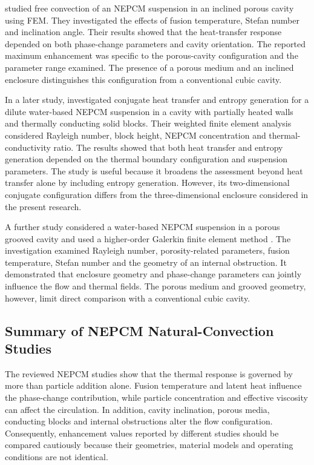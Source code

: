 \citet{ghalambaz2020} studied free convection of an NEPCM suspension in an inclined porous cavity using FEM. They investigated the effects of fusion temperature, Stefan number and inclination angle. Their results showed that the heat-transfer response depended on both phase-change parameters and cavity orientation. The reported maximum enhancement was specific to the porous-cavity configuration and the parameter range examined. The presence of a porous medium and an inclined enclosure distinguishes this configuration from a conventional cubic cavity.

In a later study, \citet{ghalambaz2023} investigated conjugate heat transfer and entropy generation for a dilute water-based NEPCM suspension in a cavity with partially heated walls and thermally conducting solid blocks. Their weighted finite element analysis considered Rayleigh number, block height, NEPCM concentration and thermal-conductivity ratio. The results showed that both heat transfer and entropy generation depended on the thermal boundary configuration and suspension parameters. The study is useful because it broadens the assessment beyond heat transfer alone by including entropy generation. However, its two-dimensional conjugate configuration differs from the three-dimensional enclosure considered in the present research.

A further study considered a water-based NEPCM suspension in a porous grooved cavity and used a higher-order Galerkin finite element method \citep{hussain2022}. The investigation examined Rayleigh number, porosity-related parameters, fusion temperature, Stefan number and the geometry of an internal obstruction. It demonstrated that enclosure geometry and phase-change parameters can jointly influence the flow and thermal fields. The porous medium and grooved geometry, however, limit direct comparison with a conventional cubic cavity.

\subsection{Summary of NEPCM Natural-Convection Studies}

The reviewed NEPCM studies show that the thermal response is governed by more than particle addition alone. Fusion temperature and latent heat influence the phase-change contribution, while particle concentration and effective viscosity can affect the circulation. In addition, cavity inclination, porous media, conducting blocks and internal obstructions alter the flow configuration. Consequently, enhancement values reported by different studies should be compared cautiously because their geometries, material models and operating conditions are not identical.

